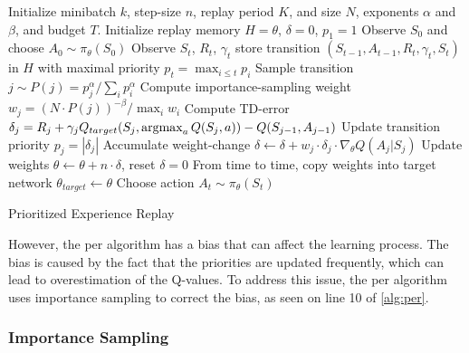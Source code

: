 \begin{algorithm}[H]
    \begin{algorithmic}[1]
        \State Initialize minibatch $k$, step-size $n$, replay period $K$, and
            size $N$, exponents $\alpha$ and $\beta$, and budget $T$.
        \State Initialize replay memory $H = \theta$, $\delta = 0$, $p_1 = 1$
        \State Observe $S_0$ and choose $A_0 \sim \pi_\theta(S_0)$
            \State Observe $S_t$, $R_t$, $\gamma_t$
            \State store transition $(S_{t-1}, A_{t-1}, R_t, \gamma_t, S_t)$ in
                $H$ with maximal priority $p_t = \max_{i \leq t} p_i$
                    \State Sample transition $j \sim P(j) = p_j^\alpha / \sum_i p_i^\alpha$
                    \State Compute importance-sampling weight $w_j = (N \cdot P(j))^{-\beta} / \max_i w_i$
                    \State Compute TD-error $\delta_j = R_j + \gamma_j Q_{target}(S_j, \operatorname{argmax}_a Q(S_j, a)) - Q(S_{j-1}, A_{j-1})$
                    \State Update transition priority $p_j = |\delta_j|$
                    \State Accumulate weight-change $\delta \leftarrow \delta + w_j \cdot \delta_j \cdot \nabla_\theta Q(A_j | S_j)$
                \EndFor
                \State Update weights $\theta \leftarrow \theta + n \cdot \delta$, reset $\delta = 0$
                \State From time to time, copy weights into target network $\theta_{target} \leftarrow \theta$
            \EndIf
            \State Choose action $A_t \sim \pi_\theta(S_t)$
        \EndFor
    \end{algorithmic}
    \caption{Prioritized Experience Replay}
    \label{alg:per}
\end{algorithm}

However, the \gls{per} algorithm has a bias that can affect the learning
process. The bias is caused by the fact that the priorities are updated
frequently, which can lead to overestimation of the Q-values. To address this
issue, the \gls{per} algorithm uses importance sampling to correct the bias,
as seen on line 10 of \cref{alg:per}.

\subsubsection{Importance Sampling}\label{sec:agent-dqn-per-importance-sampling}
